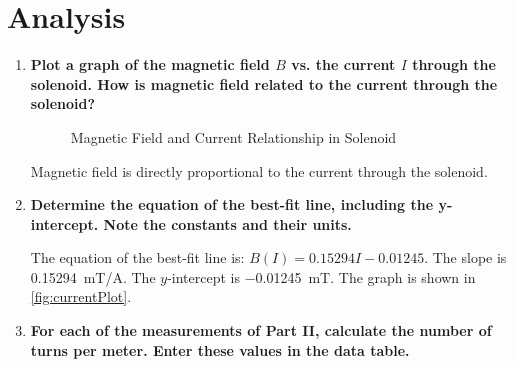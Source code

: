 \documentclass[article, 12pt]{article}
\begin{document}
     \section{Analysis}
     \begin{enumerate}[1.]
         \item \textbf{Plot a graph of the magnetic field $B$ vs. the current $I$ through the solenoid. How is magnetic field related to the current through the solenoid?}
         \begin{figure}[H]
            \centering
            \caption{Magnetic Field and Current Relationship in Solenoid}
            \label{fig:currentPlot}
         \end{figure}
         Magnetic field is directly proportional to the current through the solenoid.
         \item \textbf{Determine the equation of the best-fit line, including the y-intercept. Note the constants and
         their units.}

         The equation of the best-fit line is: $B(I) = 0.15294I - 0.01245$. The slope is \SI{0.15294}{\milli\tesla/\ampere}. The $y$-intercept is \SI{-0.01245}{\milli\tesla}. The graph is shown in \autoref{fig:currentPlot}.
         \item \textbf{For each of the measurements of Part II, calculate the number of turns per meter. Enter these
         values in the data table.}


\end{enumerate}
\end{document}
